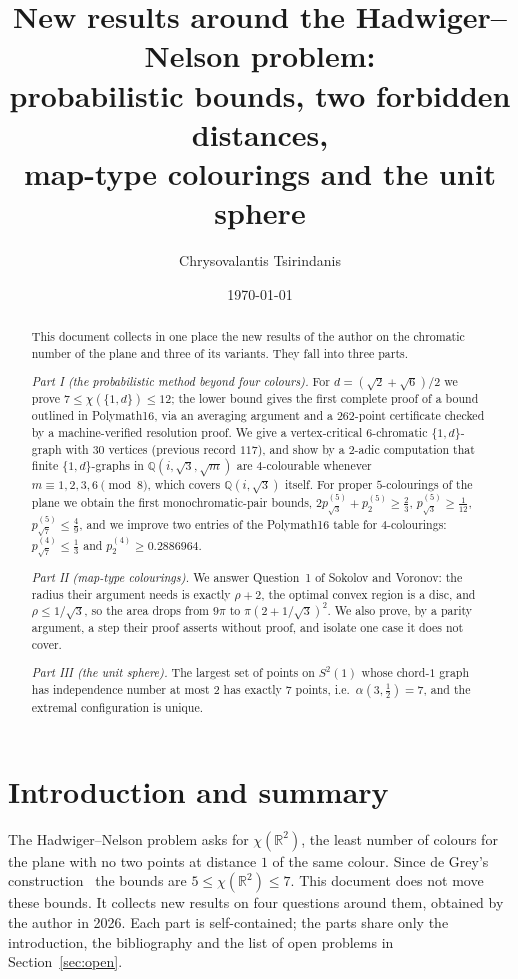 \documentclass[11pt,a4paper]{amsart}
\title[New results around the Hadwiger--Nelson problem]{New results around the Hadwiger--Nelson problem:\\ probabilistic bounds, two forbidden distances,\\ map-type colourings and the unit sphere}
\author{Chrysovalantis Tsirindanis}
\date{\today}
\theoremstyle{remark}
\newcommand{\Q}{\mathbb{Q}}
\newcommand{\R}{\mathbb{R}}
\begin{document}
\begin{abstract}
This document collects in one place the new results of the author on the chromatic number of the plane and three of its variants. They fall into three parts.

\emph{Part I (the probabilistic method beyond four colours).} For $d=(\sqrt2+\sqrt6)/2$ we prove $7\le\chi(\{1,d\})\le12$; the lower bound gives the first complete proof of a bound outlined in Polymath16, via an averaging argument and a $262$-point certificate checked by a machine-verified resolution proof. We give a vertex-critical $6$-chromatic $\{1,d\}$-graph with $30$ vertices (previous record $117$), and show by a $2$-adic computation that finite $\{1,d\}$-graphs in $\Q(i,\sqrt3,\sqrt m)$ are $4$-colourable whenever $m\equiv1,2,3,6\pmod8$, which covers $\Q(i,\sqrt3)$ itself. For proper $5$-colourings of the plane we obtain the first monochromatic-pair bounds, $2p^{(5)}_{\sqrt3}+p^{(5)}_2\ge\frac23$, $p^{(5)}_{\sqrt3}\ge\frac1{12}$, $p^{(5)}_{\sqrt7}\le\frac49$, and we improve two entries of the Polymath16 table for $4$-colourings: $p^{(4)}_{\sqrt7}\le\frac13$ and $p^{(4)}_2\ge0.2886964$.

\emph{Part II (map-type colourings).} We answer Question~1 of Sokolov and Voronov: the radius their argument needs is exactly $\rho+2$, the optimal convex region is a disc, and $\rho\le1/\sqrt3$, so the area drops from $9\pi$ to $\pi(2+1/\sqrt3)^2$. We also prove, by a parity argument, a step their proof asserts without proof, and isolate one case it does not cover.

\emph{Part III (the unit sphere).} The largest set of points on $S^2(1)$ whose chord-$1$ graph has independence number at most $2$ has exactly $7$ points, i.e.\ $\alpha(3,\tfrac12)=7$, and the extremal configuration is unique.
\end{abstract}

\maketitle
\tableofcontents

\section{Introduction and summary}

The Hadwiger--Nelson problem asks for $\chi(\R^2)$, the least number of colours for the plane with no two points at distance $1$ of the same colour. Since de Grey's construction~\cite{dG18} the bounds are $5\le\chi(\R^2)\le7$. This document does not move these bounds. It collects new results on four questions around them, obtained by the author in 2026. Each part is self-contained; the parts share only the introduction, the bibliography and the list of open problems in Section~\ref{sec:open}.
\end{document}
